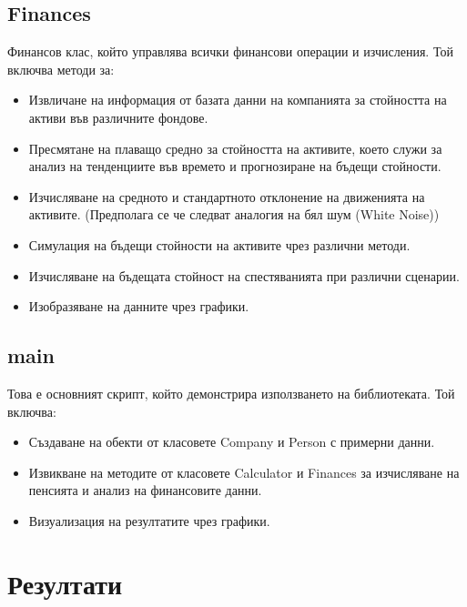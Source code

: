 \documentclass[a4paper,12pt]{article}
\begin{document}
\subsection{Finances}
Финансов клас, който управлява всички финансови операции и изчисления. Той включва методи за:
\begin{itemize}
        \item Извличане на информация от базата данни на компанията за стойността на активи във различните фондове.
        \item Пресмятане на плаващо средно за стойността на активите, което служи за анализ на тенденциите във времето и прогнозиране на бъдещи стойности.
        \item Изчисляване на средното и стандартното отклонение на движенията на активите. (Предполага се че следват аналогия на бял шум (White Noise))
        \item Симулация на бъдещи стойности на активите чрез различни методи.
        \item Изчисляване на бъдещата стойност на спестяванията при различни сценарии.
        \item Изобразяване на данните чрез графики.
\end{itemize}
\subsection{main}
Това е основният скрипт, който демонстрира използването на библиотеката. Той включва:
\begin{itemize}
        \item Създаване на обекти от класовете Company и Person с примерни данни.
        \item Извикване на методите от класовете Calculator и Finances за изчисляване на пенсията и анализ на финансовите данни.
        \item Визуализация на резултатите чрез графики.
\end{itemize}
\newpage

\section{Резултати}
\end{document}
